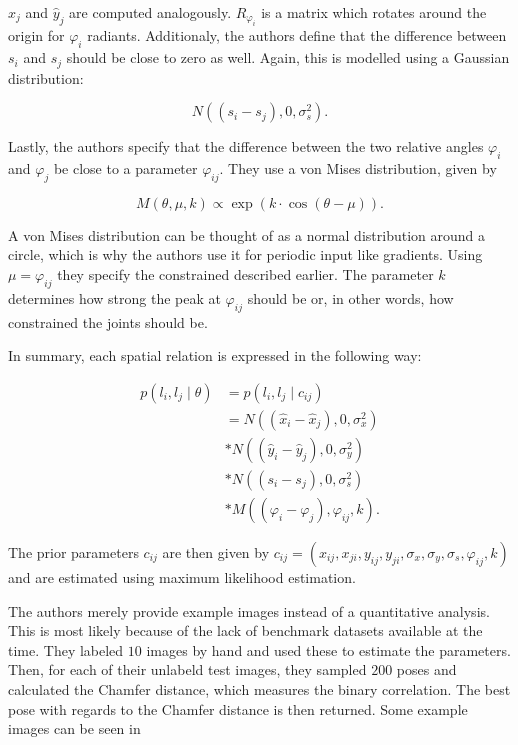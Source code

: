 $\hat{x}_j$ and $\hat{y}_j$ are computed analogously.
$R_{\varphi_i}$ is a matrix which rotates around the origin for $\varphi_i$ radiants.
Additionaly, the authors define that the difference between $s_i$ and $s_j$ should be close to zero as well.
Again, this is modelled using a Gaussian distribution:

\begin{equation}
    N((s_i - s_j), 0, \sigma^2_s).
\end{equation}

Lastly, the authors specify that the difference between the two relative angles $\varphi_i$ and $\varphi_j$ be close to a parameter $\varphi_{ij}$.
They use a von Mises distribution, given by

\begin{equation}
    M(\theta, \mu, k) \propto \exp (k \cdot \cos (\theta - \mu)).
\end{equation}

A von Mises distribution can be thought of as a normal distribution around a circle, which is why the authors use it for periodic input like gradients.
Using $\mu = \varphi_{ij}$ they specify the constrained described earlier.
The parameter $k$ determines how strong the peak at $\varphi_{ij}$ should be or, in other words, how constrained the joints should be.

In summary, each spatial relation is expressed in the following way:

\begin{equation}
    \begin{split}
        p(l_i, l_j \mid \theta) 
        &= p(l_i, l_j \mid c_{ij}) \\
        &= N((\hat{x}_i - \hat{x}_j), 0, \sigma_x^2) \\
        &* N((\hat{y}_i - \hat{y}_j), 0, \sigma_y^2) \\
        &* N((s_i - s_j), 0, \sigma_s^2) \\
        &* M((\varphi_i - \varphi_j), \varphi_{ij}, k).
    \end{split}    
\end{equation}

The prior parameters $c_{ij}$ are then given by $c_{ij} = (x_{ij}, x_{ji}, y_{ij}, y_{ji}, \sigma_x, \sigma_y, \sigma_s, \varphi_{ij}, k)$ and are estimated using maximum likelihood estimation.

The authors merely provide example images instead of a quantitative analysis.
This is most likely because of the lack of benchmark datasets available at the time.
They labeled $10$ images by hand and used these to estimate the parameters.
Then, for each of their unlabeld test images, they sampled $200$ poses and calculated the Chamfer distance, which measures the binary correlation.
The best pose with regards to the Chamfer distance is then returned.
Some example images can be seen in 

